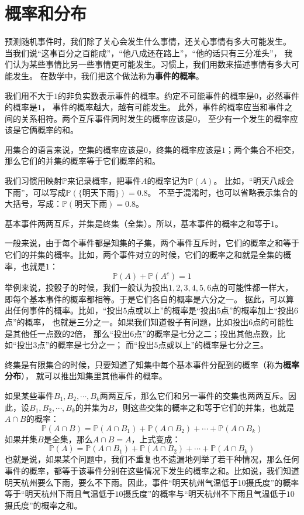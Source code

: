 \documentclass[12pt,UTF8]{ctexbook}
\begin{document}
\section{概率和分布}

预测随机事件时，我们除了关心会发生什么事情，还关心事情有多大可能发生。
当我们说“这事百分之百能成”，“他八成还在路上”，“他的话只有三分准头”，
我们认为某些事情比另一些事情更可能发生。习惯上，我们用数来描述事情有多大可能发生。
在数学中，我们把这个做法称为\textbf{事件的概率}。

我们用不大于$1$的非负实数表示事件的概率。约定不可能事件的概率是$0$，必然事件的概率是$1$，
事件的概率越大，越有可能发生。
此外，事件的概率应当和事件之间的关系相符。两个互斥事件同时发生的概率应该是$0$，
至少有一个发生的概率应该是它俩概率的和。

用集合的语言来说，空集的概率应该是$0$，终集的概率应该是$1$；两个集合不相交，那么它们的并集的概率等于它们概率的和。

我们习惯用映射$\mathbb{P}$来记录概率，把事件$A$的概率记为$\mathbb{P}(A)$。
比如，“明天八成会下雨”，可以写成$\mathbb{P}(\{\mbox{明天下雨}\}) = 0.8$。
不至于混淆时，也可以省略表示集合的大括号，写成：$\mathbb{P}(\mbox{明天下雨}) = 0.8$。

基本事件两两互斥，并集是终集（全集）。所以，基本事件的概率之和等于$1$。

一般来说，由于每个事件都是知集的子集，两个事件互斥时，它们的概率之和等于它们的并集的概率。比如，两个事件对立的时候，它们的概率之和就是全集的概率，也就是$1$：
$$
\mathbb{P}(A) + \mathbb{P}(A^c) = 1
$$
举例来说，投骰子的时候，我们一般认为投出$1,2,3,4,5,6$点的可能性都一样大，
即每个基本事件的概率都相等。于是它们各自的概率是六分之一。
据此，可以算出任何事件的概率。比如，“投出$5$点或以上”的概率是“投出$5$点”的概率加上“投出$6$点”的概率，
也就是三分之一。如果我们知道骰子有问题，比如投出$6$点的可能性是其他任一点数的$2$倍，
那么“投出$6$点”的概率是七分之二；投出其他点数，比如“投出$3$点”的概率是七分之一；
而“投出$5$点或以上”的概率是七分之三。

终集是有限集合的时候，只要知道了知集中每个基本事件分配到的概率（称为\textbf{概率分布}），
就可以推出知集里其他事件的概率。

如果某些事件$B_1, B_2, \cdots, B_k$两两互斥，那么它们和另一事件的交集也两两互斥。因此，设$B_1, B_2, \cdots, B_k$的并集为$B$，则这些交集的概率之和等于它们的并集，也就是$A\cap B$的概率：
$$
\mathbb{P}(A\cap B) = \mathbb{P}(A\cap B_1) + \mathbb{P}(A\cap B_2) + \cdots + \mathbb{P}(A\cap B_k)
$$
如果并集$B$是全集，那么$A\cap B = A$，上式变成：
$$
\mathbb{P}(A) = \mathbb{P}(A\cap B_1) + \mathbb{P}(A\cap B_2) + \cdots + \mathbb{P}(A\cap B_k)
$$
也就是说，如果某个问题中，我们不重复也不遗漏地列举了若干种情况，那么任何事件的概率，都等于该事件分别在这些情况下发生的概率之和。比如说，我们知道明天杭州要么下雨，要么不下雨。因此，事件“明天杭州气温低于$10$摄氏度”的概率等于“明天杭州下雨且气温低于$10$摄氏度”的概率与“明天杭州不下雨且气温低于$10$摄氏度”的概率之和。
\end{document}
